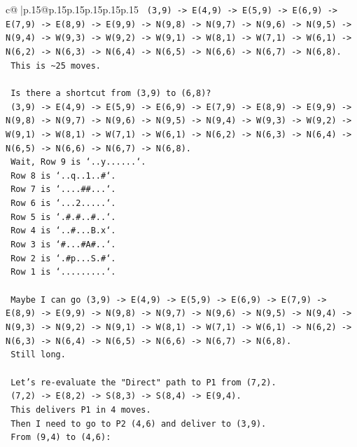 \documentclass{article}
\begin{document}
{\begin{supertabular}{c@{$\;$}|p{.15\linewidth}@{}p{.15\linewidth}p{.15\linewidth}p{.15\linewidth}p{.15\linewidth}p{.15\linewidth}}
{{{\texttt{    (3,9) {-}> E(4,9) {-}> E(5,9) {-}> E(6,9) {-}> E(7,9) {-}> E(8,9) {-}> E(9,9) {-}> N(9,8) {-}> N(9,7) {-}> N(9,6) {-}> N(9,5) {-}> N(9,4) {-}> W(9,3) {-}> W(9,2) {-}> W(9,1) {-}> W(8,1) {-}> W(7,1) {-}> W(6,1) {-}> N(6,2) {-}> N(6,3) {-}> N(6,4) {-}> N(6,5) {-}> N(6,6) {-}> N(6,7) {-}> N(6,8).} \\
\texttt{    This is \textasciitilde{}25 moves.} \\
\\ 
\texttt{    Is there a shortcut from (3,9) to (6,8)?} \\
\texttt{    (3,9) {-}> E(4,9) {-}> E(5,9) {-}> E(6,9) {-}> E(7,9) {-}> E(8,9) {-}> E(9,9) {-}> N(9,8) {-}> N(9,7) {-}> N(9,6) {-}> N(9,5) {-}> N(9,4) {-}> W(9,3) {-}> W(9,2) {-}> W(9,1) {-}> W(8,1) {-}> W(7,1) {-}> W(6,1) {-}> N(6,2) {-}> N(6,3) {-}> N(6,4) {-}> N(6,5) {-}> N(6,6) {-}> N(6,7) {-}> N(6,8).} \\
\texttt{    Wait, Row 9 is `..y......`.} \\
\texttt{    Row 8 is `..q..1..\#`.} \\
\texttt{    Row 7 is `....\#\#...`.} \\
\texttt{    Row 6 is `...2.....`.} \\
\texttt{    Row 5 is `.\#.\#..\#..`.} \\
\texttt{    Row 4 is `..\#...B.x`.} \\
\texttt{    Row 3 is `\#...\#A\#..`.} \\
\texttt{    Row 2 is `.\#p...S.\#`.} \\
\texttt{    Row 1 is `.........`.} \\
\\ 
\texttt{    Maybe I can go (3,9) {-}> E(4,9) {-}> E(5,9) {-}> E(6,9) {-}> E(7,9) {-}> E(8,9) {-}> E(9,9) {-}> N(9,8) {-}> N(9,7) {-}> N(9,6) {-}> N(9,5) {-}> N(9,4) {-}> N(9,3) {-}> N(9,2) {-}> N(9,1) {-}> W(8,1) {-}> W(7,1) {-}> W(6,1) {-}> N(6,2) {-}> N(6,3) {-}> N(6,4) {-}> N(6,5) {-}> N(6,6) {-}> N(6,7) {-}> N(6,8).} \\
\texttt{    Still long.} \\
\\ 
\texttt{    Let's re{-}evaluate the "Direct" path to P1 from (7,2).} \\
\texttt{    (7,2) {-}> E(8,2) {-}> S(8,3) {-}> S(8,4) {-}> E(9,4).} \\
\texttt{    This delivers P1 in 4 moves.} \\
\texttt{    Then I need to go to P2 (4,6) and deliver to (3,9).} \\
\texttt{    From (9,4) to (4,6):} \\
}}}
\end{supertabular}}
\end{document}
